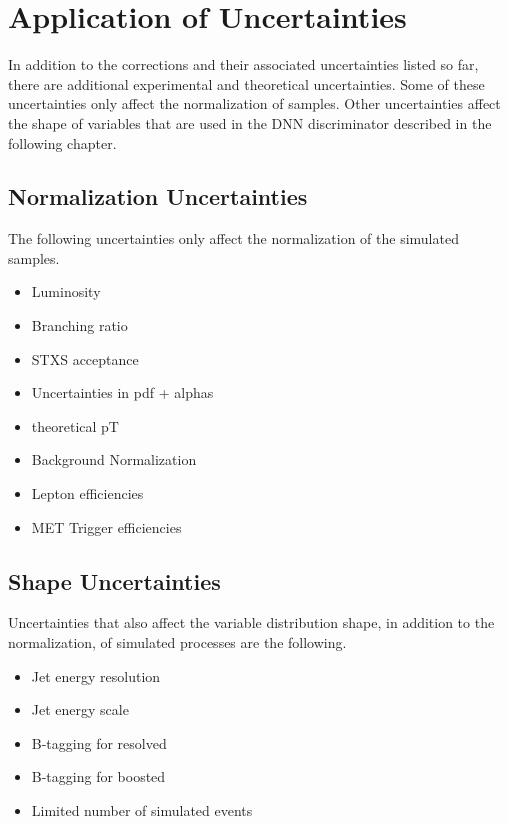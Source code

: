 \section{Application of Uncertainties}

In addition to the corrections and their associated uncertainties listed so far,
there are additional experimental and theoretical uncertainties.
Some of these uncertainties only affect the normalization of samples.
Other uncertainties affect the shape of variables that are used in the DNN
discriminator described in the following chapter.

\subsection{Normalization Uncertainties}

The following uncertainties only affect the normalization of the simulated samples.
\begin{itemize}
\item Luminosity
\item Branching ratio
\item STXS acceptance
\item Uncertainties in pdf + alphas
\item theoretical pT
\item Background Normalization
\item Lepton efficiencies
\item MET Trigger efficiencies
\end{itemize}

\subsection{Shape Uncertainties}

Uncertainties that also affect the variable distribution shape,
in addition to the normalization, of simulated processes are the following.
\begin{itemize}
\item Jet energy resolution
\item Jet energy scale
\item B-tagging for resolved
\item B-tagging for boosted
\item Limited number of simulated events
\end{itemize}
